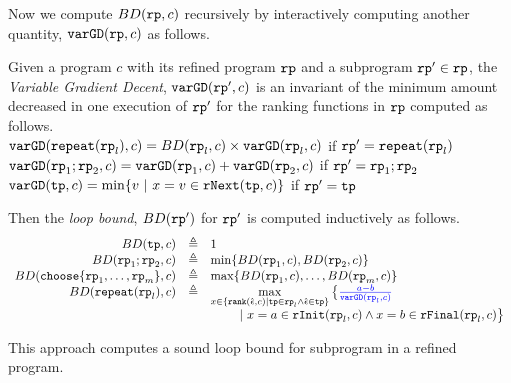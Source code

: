 Now we compute $BD(\mathtt{rp}, c)$ recursively by interactively computing another quantity, $\mathtt{varGD}(\mathtt{rp}, c)$ as follows.
\begin{defn}
\label{def:loopbound}
Given a program $c$ with its refined program $\mathtt{rp}$ and a subprogram $\mathtt{rp}' \in \mathtt{rp}$,
the \emph{Variable Gradient Decent}, 
 $\mathtt{varGD}(\mathtt{rp}', c)$ is an invariant of the minimum amount decreased in one execution of $\mathtt{rp}'$ for the ranking functions in $\mathtt{rp}$ computed as follows.
 \\
 {$\mathtt{varGD}(\mathtt{repeat}(\mathtt{rp}_l), c) =  BD(\mathtt{rp}_l, c)  \times
{\ensuremath{\mathtt{varGD}}(\ensuremath{\mathtt{rp}}_l, c)}$} if $\mathtt{rp}' = \mathtt{repeat}(\mathtt{rp}_l)$
 \\
 $\mathtt{varGD}(\mathtt{rp}_1;\mathtt{rp}_2, c) =  \mathtt{varGD}(\mathtt{rp}_1, c) + \mathtt{varGD}(\mathtt{rp}_2, c)$ if $\mathtt{rp}' = \mathtt{rp}_1;\mathtt{rp}_2$
 \\
 $\varGD(\tpath, c) =  \min\left\{v  ~|~ x = v \in \rfnext(\tpath, c) \right\}  $  if $\mathtt{rp}' = \mathtt{tp}$

 Then the \emph{loop bound}, $BD(\mathtt{rp}')$ for $\mathtt{rp}'$ is computed inductively as follows.
{\small
  \[
    \begin{array}{rcl}
      BD(\tpath, c) & \triangleq & 1 \\
      BD(\rprog_1;\rprog_2, c) & \triangleq & \min \left\{BD(\rprog_1, c), BD(\rprog_2, c) \right\} \\
      BD(\rpchoose{\rprog_1, \ldots, \rprog_m }, c) & \triangleq 
      & \max\left\{ BD(\rprog_1, c), \ldots, BD(\rprog_m, c) \right\} \\
      BD(\rprepeat(\rprog_l), c) & \triangleq 
      &
      \max\limits_{x \in \left\{ \locbound(\absevent, c) | \tpath \in \rprog_l \land \absevent \in \tpath \right\}}
      \big\{ \highlight{\frac{a - b}{\varGD(\rprog_l, c)}}
      \\ & & \qquad
      ~\vert~ x = a \in \rfinit(\rprog_l, c)
      \land x = b \in \rffinal(\rprog_l, c)
      \big\} 
    \end{array}
  \]
}
\end{defn}
This approach computes a sound loop bound for subprogram in a refined program.

